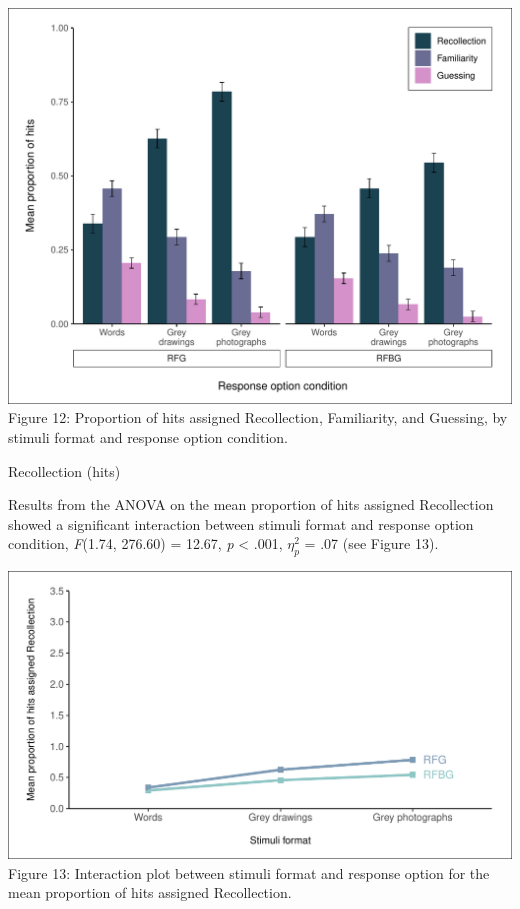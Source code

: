 \documentclass[
  11pt,
]{article}
\begin{document}
\includegraphics{R--Thesis_files/figure-latex/unnamed-chunk-34-1.pdf}
Figure 12: Proportion of hits assigned Recollection, Familiarity, and
Guessing, by stimuli format and response option condition.

Recollection (hits)

Results from the ANOVA on the mean proportion of hits assigned
Recollection showed a significant interaction between stimuli format and
response option condition, \emph{F}(1.74, 276.60) = 12.67, \emph{p}
\textless{} .001, \(\eta^2_p\) = .07 (see Figure 13).

\includegraphics{R--Thesis_files/figure-latex/unnamed-chunk-36-1.pdf}
Figure 13: Interaction plot between stimuli format and response option
for the mean proportion of hits assigned Recollection. ~~
\end{document}
